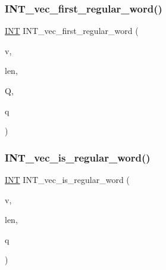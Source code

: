 \mbox{\label{combinatorics_8_c_aae45cc5e9bd6bce289b3c29b88afade5}} 
\subsubsection{\texorpdfstring{I\+N\+T\+\_\+vec\+\_\+first\+\_\+regular\+\_\+word()}{INT\_vec\_first\_regular\_word()}}
{\footnotesize\ttfamily \mbox{\hyperlink{galois_8h_a09fddde158a3a20bd2dcadb609de11dc}{I\+NT}} I\+N\+T\+\_\+vec\+\_\+first\+\_\+regular\+\_\+word (\begin{DoxyParamCaption}\item[{\mbox{\hyperlink{galois_8h_a09fddde158a3a20bd2dcadb609de11dc}{I\+NT}} $\ast$}]{v,  }\item[{\mbox{\hyperlink{galois_8h_a09fddde158a3a20bd2dcadb609de11dc}{I\+NT}}}]{len,  }\item[{\mbox{\hyperlink{galois_8h_a09fddde158a3a20bd2dcadb609de11dc}{I\+NT}}}]{Q,  }\item[{\mbox{\hyperlink{galois_8h_a09fddde158a3a20bd2dcadb609de11dc}{I\+NT}}}]{q }\end{DoxyParamCaption})}

\mbox{\label{combinatorics_8_c_a4d39df6115045582a88a1fd8d71c8824}} 
\subsubsection{\texorpdfstring{I\+N\+T\+\_\+vec\+\_\+is\+\_\+regular\+\_\+word()}{INT\_vec\_is\_regular\_word()}}
{\footnotesize\ttfamily \mbox{\hyperlink{galois_8h_a09fddde158a3a20bd2dcadb609de11dc}{I\+NT}} I\+N\+T\+\_\+vec\+\_\+is\+\_\+regular\+\_\+word (\begin{DoxyParamCaption}\item[{\mbox{\hyperlink{galois_8h_a09fddde158a3a20bd2dcadb609de11dc}{I\+NT}} $\ast$}]{v,  }\item[{\mbox{\hyperlink{galois_8h_a09fddde158a3a20bd2dcadb609de11dc}{I\+NT}}}]{len,  }\item[{\mbox{\hyperlink{galois_8h_a09fddde158a3a20bd2dcadb609de11dc}{I\+NT}}}]{q }\end{DoxyParamCaption})}

